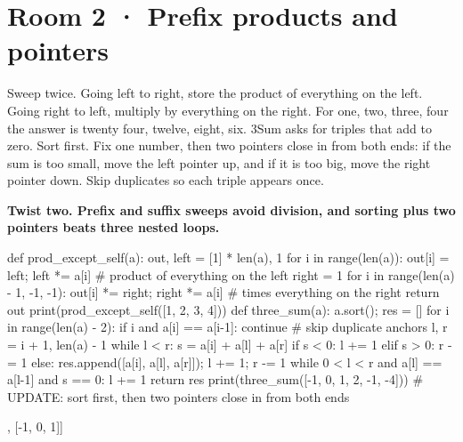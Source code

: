 \documentclass[11pt,a4paper]{report}
\begin{document}
\section*{Room 2 · Prefix products and pointers}
Sweep twice. Going left to right, store the product of everything on the left. Going right to left, multiply by everything on the right. For one, two, three, four the answer is twenty four, twelve, eight, six. 3Sum asks for triples that add to zero. Sort first. Fix one number, then two pointers close in from both ends: if the sum is too small, move the left pointer up, and if it is too big, move the right pointer down. Skip duplicates so each triple appears once.
\begin{tcolorbox}[colback=yellow!12,colframe=orange!70!black,boxrule=0.4pt,left=4pt,right=4pt,top=2pt,bottom=2pt]\textbf{Twist two. Prefix and suffix sweeps avoid division, and sorting plus two pointers beats three nested loops.}\end{tcolorbox}
\begin{Code}
def prod_except_self(a):
    out, left = [1] * len(a), 1
    for i in range(len(a)): out[i] = left; left *= a[i]            # product of everything on the left
    right = 1
    for i in range(len(a) - 1, -1, -1): out[i] *= right; right *= a[i]   # times everything on the right
    return out
print(prod_except_self([1, 2, 3, 4]))
def three_sum(a):
    a.sort(); res = []
    for i in range(len(a) - 2):
        if i and a[i] == a[i-1]: continue                          # skip duplicate anchors
        l, r = i + 1, len(a) - 1
        while l < r:
            s = a[i] + a[l] + a[r]
            if s < 0: l += 1
            elif s > 0: r -= 1
            else: res.append([a[i], a[l], a[r]]); l += 1; r -= 1
            while 0 < l < r and a[l] == a[l-1] and s == 0: l += 1
    return res
print(three_sum([-1, 0, 1, 2, -1, -4]))
# UPDATE: sort first, then two pointers close in from both ends
\end{Code}
\begin{Out}
[24, 12, 8, 6]
[[-1, -1, 2], [-1, 0, 1]]
\end{Out}
\end{document}
